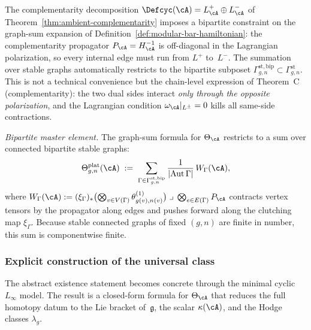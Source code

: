 \begin{remark}
\label{rem:mc2-bipartite}
The complementarity decomposition
$\Defcyc(\cA) = L^+_\cA \oplus L^-_\cA$
of Theorem~\ref{thm:ambient-complementarity} imposes a
bipartite constraint on the graph-sum expansion of
Definition~\ref{def:modular-bar-hamiltonian}: the
complementarity propagator $P_\cA = H_\cA^{-1}$ is
off-diagonal in the Lagrangian polarization, so every internal
edge must run from $L^+$ to~$L^-$.  The summation over stable
graphs automatically restricts to the bipartite subposet
$\Gamma^{\mathrm{st,bip}}_{g,n}
\subset \Gamma^{\mathrm{st}}_{g,n}$.
This is not a technical convenience but the chain-level
expression of Theorem~C (complementarity): the two dual sides
interact \emph{only through the opposite polarization}, and
the Lagrangian condition $\omega_\cA|_{L^\pm} = 0$ kills all
same-side contractions.

\emph{Bipartite master element.}
The graph-sum formula for $\Theta_\cA$ restricts to a sum
over connected bipartite stable graphs:
\begin{equation}\label{eq:bipartite-master}
\Theta^{\mathrm{plat}}_{g,n}(\cA)
\;:=\;
\sum_{\Gamma \in \Gamma^{\mathrm{st,bip}}_{g,n}}
\frac{1}{|\mathrm{Aut}\,\Gamma|}\,
W_\Gamma(\cA),
\end{equation}
where
$W_\Gamma(\cA)
:= (\xi_\Gamma)_*
\bigl(\bigotimes_{v \in V(\Gamma)}
\theta^{(1)}_{g(v),n(v)}\bigr)
\;\lrcorner\;
\bigotimes_{e \in E(\Gamma)} P_\cA$
contracts vertex tensors by the propagator along edges and
pushes forward along the clutching map $\xi_\Gamma$.
Because stable connected graphs of fixed $(g,n)$ are finite in
number, this sum is componentwise finite.
\end{remark}

\subsubsection*{Explicit construction of the universal class}

The abstract existence statement becomes concrete through
the minimal cyclic $L_\infty$ model.  The result is a closed-form
formula for $\Theta_{\cA}$ that reduces the full homotopy datum to
the Lie bracket of~$\mathfrak{g}$, the scalar $\kappa(\cA)$, and
the Hodge classes $\lambda_g$.

